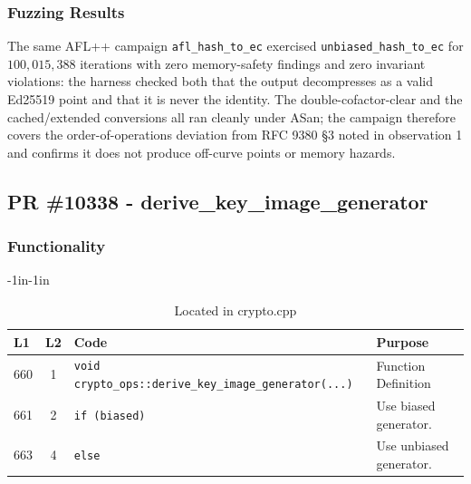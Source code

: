 \documentclass[12pt,titlepage,table]{article}
\begin{document}
\subsubsection{Fuzzing Results}
The same AFL++ campaign \verb+afl_hash_to_ec+ exercised \verb+unbiased_hash_to_ec+ for $100{,}015{,}388$ iterations with zero memory-safety findings and zero invariant violations: the harness checked both that the output decompresses as a valid Ed25519 point and that it is never the identity.  The double-cofactor-clear and the cached/extended conversions all ran cleanly under ASan; the campaign therefore covers the order-of-operations deviation from RFC 9380 \S3 noted in observation 1 and confirms it does not produce off-curve points or memory hazards.


\newpage
\subsection{PR \#10338 - derive\_key\_image\_generator}
\subsubsection{Functionality}


\begin{table}[htbp]
\caption{derive\_key\_image\_generator Source To Spec Map}
\begin{adjustwidth}{-1in}{-1in}
\centering
{
\begin{tabular}{| l | c | l | l |}
\hline
\textbf{L1} & \textbf{L2} & \textbf{Code} & \textbf{Purpose} \\
\hline
\hline
660 & 1 & \verb+void crypto_ops::derive_key_image_generator(...)+ & Function Definition \\
661 & 2 & \verb+if (biased)+ & Use biased generator. \\
663 & 4 & \verb+else+ & Use unbiased generator. \\
\hline
\end{tabular}}
\end{adjustwidth}
\caption*{Located in crypto.cpp}
\end{table}
\end{document}
